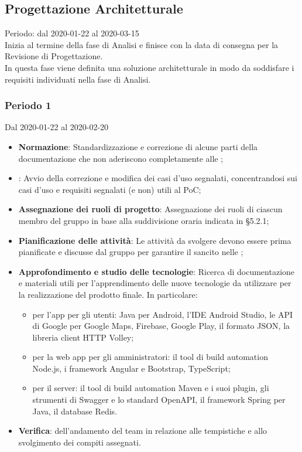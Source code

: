 \subsection{Progettazione Architetturale}
Periodo: dal 2020-01-22 al 2020-03-15\\
Inizia al termine della fase di Analisi e finisce con la data di consegna per la Revisione di Progettazione.\\
In questa fase viene definita una soluzione architetturale in modo da soddisfare i requisiti individuati nella fase di Analisi.

\subsubsection{Periodo 1} 
Dal 2020-01-22 al 2020-02-20
\begin{itemize}
	\item \textbf{Normazione}: Standardizzazione e correzione di alcune parti della documentazione che non aderiscono completamente alle \NdP{};
	\item \textbf{\AdR{}}: Avvio della correzione e modifica dei casi d'uso segnalati, concentrandosi sui casi d'uso e requisiti segnalati (e non) utili al PoC;
	\item \textbf{Assegnazione dei ruoli di progetto}: Assegnazione dei ruoli di ciascun membro del gruppo in base alla suddivisione oraria indicata in §5.2.1;
	\item \textbf{Pianificazione delle attività}: Le attività da svolgere devono essere prima pianificate e discusse dal gruppo per garantire il  sancito nelle \NdP{};
	\item \textbf{Approfondimento e studio delle tecnologie}: Ricerca di documentazione e materiali utili per l'apprendimento delle nuove tecnologie da utilizzare per la realizzazione del prodotto finale.
	In particolare:
	\begin{itemize}
		\item per l'app per gli utenti: Java per Android, l'IDE Android Studio, le API di Google per Google Maps, Firebase, Google Play, il formato JSON, la libreria client HTTP Volley;
		\item per la web app per gli amministratori: il tool di build automation Node.js, i framework Angular e Bootstrap, TypeScript;
		\item per il server: il tool di build automation Maven e i suoi plugin, gli strumenti di Swagger e lo standard OpenAPI, il framework Spring per Java, il database Redis.
	\end{itemize}
	\item \textbf{Verifica}:  dell'andamento del team in relazione alle tempistiche e allo svolgimento dei compiti assegnati.
\end{itemize}

